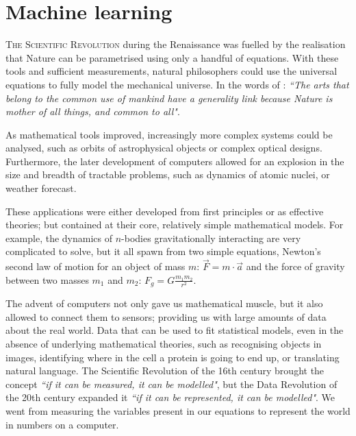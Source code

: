 \chapter{Machine learning}
\lettrine[lines=3, lhang=0.2, nindent=0em]{\color{Maroon}T}{he Scientific Revolution}
during the Renaissance 
was fuelled by the realisation that Nature can be parametrised using only a handful of equations.
With these tools and sufficient measurements, natural philosophers could use the universal equations to fully model the mechanical universe.
In the words of \citet{carranza}: \emph{{``The arts that belong to the common use of mankind have a generality link because Nature is mother of all things, and common to all"}}.

As mathematical tools improved, increasingly more complex systems could be analysed, such as orbits of astrophysical objects or complex optical designs.
Furthermore, the later development of computers allowed for an explosion in the size and breadth of tractable problems, such as dynamics of atomic nuclei, or weather forecast.

These applications 
were either developed from first principles or as effective theories; but contained at their core, relatively simple mathematical models.
For example, the dynamics of $n$-bodies gravitationally interacting are very complicated to solve, but it all spawn from two simple equations, Newton's second law of motion for an object of mass $m$: $\vec{F} = m \cdot \vec{a}$ and the force of gravity between two masses $m_1$ and $m_2$: $F_g=G\frac{m_1  m_2}{r^2}$.

The advent of computers not only gave us mathematical muscle, but it also allowed to connect them to sensors;
providing us with large amounts of data about the real world.
Data that can be used to fit statistical models, even in the absence of underlying mathematical theories, such as recognising objects in images, identifying where in the cell a protein is going to end up, or translating natural language.
The Scientific Revolution of the 16th century brought the concept \emph{``if it can be measured, it can be modelled"}, but the Data Revolution of the 20th century expanded it \emph{``if it can be \emph{represented}, it can be modelled"}.
We went from measuring the variables present in our equations to represent the world in numbers on a computer.

